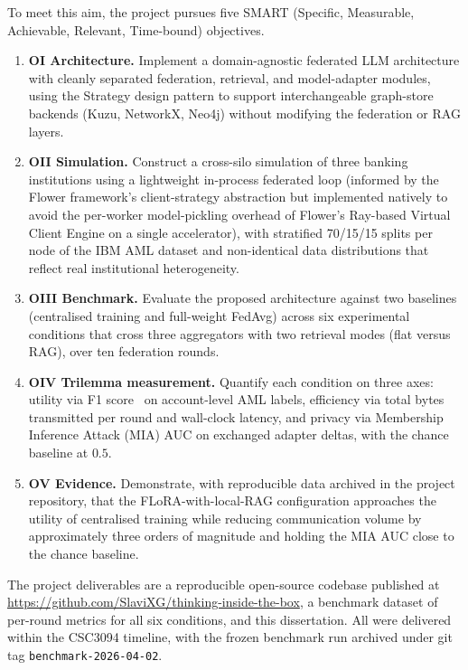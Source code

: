 \documentclass{report}
\begin{document}
To meet this aim, the project pursues five SMART (Specific, Measurable, Achievable, Relevant, Time-bound) objectives.

\begin{enumerate}
    \setlength\itemsep{0em}
    \item \textbf{OI Architecture.} Implement a domain-agnostic federated LLM architecture with cleanly separated federation, retrieval, and model-adapter modules, using the Strategy design pattern to support interchangeable graph-store backends (Kuzu, NetworkX, Neo4j) without modifying the federation or RAG layers.
    \item \textbf{OII Simulation.} Construct a cross-silo simulation of three banking institutions using a lightweight in-process federated loop (informed by the Flower framework's client-strategy abstraction \cite{beutel2022flowerfriendlyfederatedlearning} but implemented natively to avoid the per-worker model-pickling overhead of Flower's Ray-based Virtual Client Engine on a single accelerator), with stratified 70/15/15 splits per node of the IBM AML dataset and non-identical data distributions that reflect real institutional heterogeneity.
    \item \textbf{OIII Benchmark.} Evaluate the proposed architecture against two baselines (centralised training and full-weight FedAvg) across six experimental conditions that cross three aggregators with two retrieval modes (flat versus RAG), over ten federation rounds.
    \item \textbf{OIV Trilemma measurement.} Quantify each condition on three axes: utility via F1 score~\cite{10.3115/1072064.1072067} on account-level AML labels, efficiency via total bytes transmitted per round and wall-clock latency, and privacy via Membership Inference Attack (MIA) AUC on exchanged adapter deltas, with the chance baseline at $0.5$.
    \item \textbf{OV Evidence.} Demonstrate, with reproducible data archived in the project repository, that the FLoRA-with-local-RAG configuration approaches the utility of centralised training while reducing communication volume by approximately three orders of magnitude and holding the MIA AUC close to the chance baseline.
\end{enumerate}

The project deliverables are a reproducible open-source codebase published at \url{https://github.com/SlaviXG/thinking-inside-the-box}, a benchmark dataset of per-round metrics for all six conditions, and this dissertation. All were delivered within the CSC3094 timeline, with the frozen benchmark run archived under git tag \texttt{benchmark-2026-04-02}.
\end{document}
